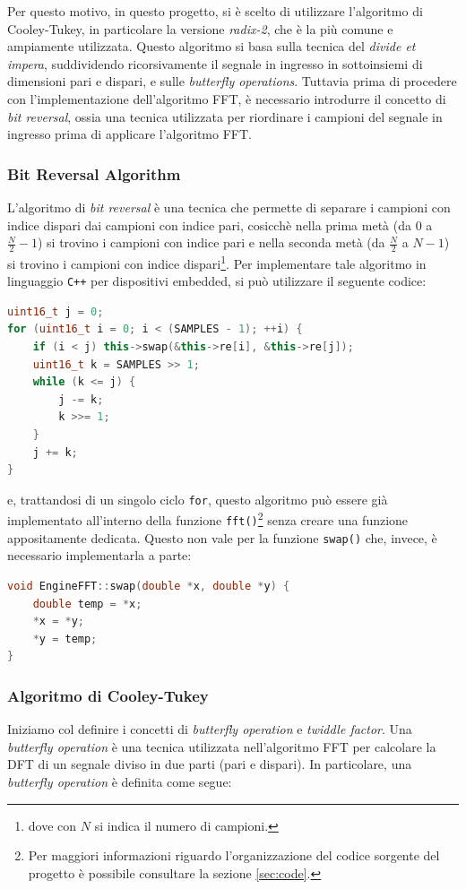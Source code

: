 \documentclass[a4paper,12pt]{report}  %
\newcommand{\lstinlinebg}[1]{\colorbox{backcolour}{\lstinline|#1|}}
\begin{document}
Per questo motivo, in questo progetto, si è scelto di utilizzare l'algoritmo di Cooley-Tukey, in particolare la versione \textit{radix-2}, che è la più comune e ampiamente utilizzata.
Questo algoritmo si basa sulla tecnica del \textit{divide et impera}, suddividendo ricorsivamente il segnale in ingresso in sottoinsiemi di dimensioni pari e dispari, e sulle \textit{butterfly operations}.
Tuttavia prima di procedere con l'implementazione dell'algoritmo FFT, è necessario introdurre il concetto di \textit{bit reversal}, ossia una tecnica utilizzata per riordinare i campioni del segnale in ingresso prima di applicare l'algoritmo FFT.

\subsubsection{Bit Reversal Algorithm}
L'algoritmo di \textit{bit reversal} è una tecnica che permette di separare i campioni con indice dispari dai campioni con indice pari, cosicchè nella prima metà (da $0$ a $\frac{N}{2} - 1$) si trovino i campioni con indice pari e nella seconda metà (da $\frac{N}{2}$ a $N - 1$) si trovino i campioni con indice dispari\footnote{dove con $N$ si indica il numero di campioni.}.
Per implementare tale algoritmo in linguaggio \lstinlinebg{C++} per dispositivi embedded, si può utilizzare il seguente codice:
\begin{lstlisting}[language=C++, keywords={void, uint16_t, while, for, if, this}]
uint16_t j = 0;
for (uint16_t i = 0; i < (SAMPLES - 1); ++i) {
    if (i < j) this->swap(&this->re[i], &this->re[j]);
    uint16_t k = SAMPLES >> 1;
    while (k <= j) {
        j -= k;
        k >>= 1;
    }
    j += k;
}
\end{lstlisting}
e, trattandosi di un singolo ciclo \lstinlinebg{for}, questo algoritmo può essere già implementato all'interno della funzione \lstinlinebg{fft()}\footnote{Per maggiori informazioni riguardo l'organizzazione del codice sorgente del progetto è possibile consultare la sezione \ref{sec:code}.} senza creare una funzione appositamente dedicata.
Questo non vale per la funzione \lstinlinebg{swap()} che, invece, è necessario implementarla a parte:
\begin{lstlisting}[language=C++, keywords={void, double}]
void EngineFFT::swap(double *x, double *y) {
    double temp = *x;
    *x = *y;
    *y = temp;
}
\end{lstlisting}

\subsubsection{Algoritmo di Cooley-Tukey}
Iniziamo col definire i concetti di \textit{butterfly operation} e \textit{twiddle factor}.
Una \textit{butterfly operation} è una tecnica utilizzata nell'algoritmo FFT per calcolare la DFT di un segnale diviso in due parti (pari e dispari).
In particolare, una \textit{butterfly operation} è definita come segue:
\end{document}
